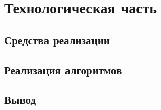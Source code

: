 \section{Технологическая часть}

\subsection{Средства реализации}


\subsection{Реализация алгоритмов}


\subsection*{Вывод}

